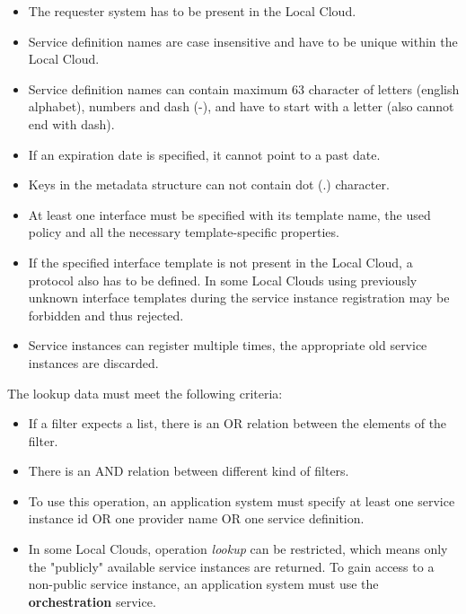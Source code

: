 \documentclass[a4paper]{arrowhead}
\begin{document}
\begin{itemize}
    \item The requester system has to be present in the Local Cloud.
    \item Service definition names are case insensitive and have to be unique within the Local Cloud.
    \item Service definition names can contain maximum 63 character of letters (english alphabet), numbers and dash (-), and have to start with a letter (also cannot end with dash).
    \item If an expiration date is specified, it cannot point to a past date.
    \item Keys in the metadata structure can not contain dot (.) character.
    \item At least one interface must be specified with its template name, the used policy and all the necessary template-specific properties.
    \item If the specified interface template is not present in the Local Cloud, a protocol also has to be defined. In some Local Clouds using previously unknown interface templates during the service instance registration may be forbidden and thus rejected.
    \item Service instances can register multiple times, the appropriate old service instances are discarded.
\end{itemize}


The lookup data must meet the following criteria:

\begin{itemize}
    \item If a filter expects a list, there is an OR relation between the elements of the filter.
    \item There is an AND relation between different kind of filters.
    \item To use this operation, an application system must specify at least one service instance id OR one provider name OR one service definition.
    \item In some Local Clouds, operation \textit{lookup} can be restricted, which means only the "publicly" available service instances are returned. To gain access to a non-public service instance, an application system must use the \textbf{orchestration} service.
\end{itemize}

\end{document}
